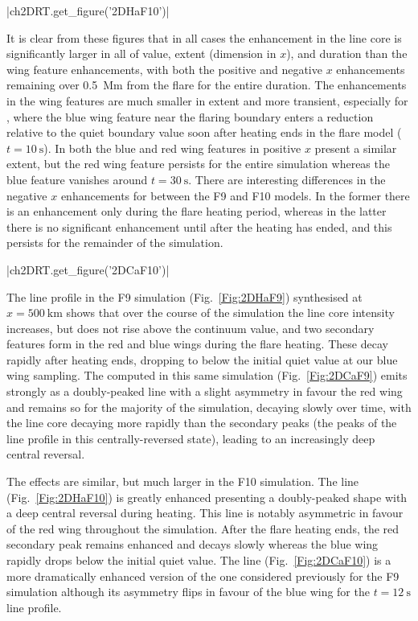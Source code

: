 \py[2DRT]|ch2DRT.get_figure('2DHaF10')|

It is clear from these figures that in all cases the enhancement in the line core is significantly larger in all of value, extent (dimension in $x$), and duration than the wing feature enhancements, with both the positive and negative $x$ enhancements remaining over \SI{0.5}{\mega\metre} from the flare for the entire duration.
The enhancements in the wing features are much smaller in extent and more transient, especially for \Ha{}, where the blue wing feature near the flaring boundary enters a reduction relative to the quiet boundary value soon after heating ends in the flare model ($t=\SI{10}{\second}$).
In \CaLine{} both the blue and red wing features in positive $x$ present a similar extent, but the red wing feature persists for the entire simulation whereas the blue feature vanishes around $t=\SI{30}{\second}$.
There are interesting differences in the negative $x$ enhancements for \CaLine{} between the F9 and F10 models.
In the former there is an enhancement only during the flare heating period, whereas in the latter there is no significant enhancement until after the heating has ended, and this persists for the remainder of the simulation.

\py[2DRT]|ch2DRT.get_figure('2DCaF10')|

The \Ha{} line profile in the F9 simulation (Fig.~\ref{Fig:2DHaF9}) synthesised at $x=\SI{500}{\kilo\metre}$ shows that over the course of the simulation the line core intensity increases, but does not rise above the continuum value, and two secondary features form in the red and blue wings during the flare heating.
These decay rapidly after heating ends, dropping to below the initial quiet value at our blue wing sampling.
The \CaLine{} computed in this same simulation (Fig.~\ref{Fig:2DCaF9}) emits strongly as a doubly-peaked line with a slight asymmetry in favour the red wing and remains so for the majority of the simulation, decaying slowly over time, with the line core decaying more rapidly than the secondary peaks (the peaks of the line profile in this centrally-reversed state), leading to an increasingly deep central reversal.

The effects are similar, but much larger in the F10 simulation.
The \Ha{} line (Fig.~\ref{Fig:2DHaF10}) is greatly enhanced presenting a doubly-peaked shape with a deep central reversal during heating.
This line is notably asymmetric in favour of the red wing throughout the simulation.
After the flare heating ends, the red secondary peak remains enhanced and decays slowly whereas the blue wing rapidly drops below the initial quiet value.
The \CaLine{} line (Fig.~\ref{Fig:2DCaF10}) is a more dramatically enhanced version of the one considered previously for the F9 simulation although its asymmetry flips in favour of the blue wing for the $t=\SI{12}{\second}$ line profile.

